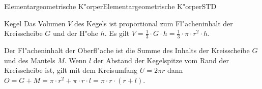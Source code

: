 \begin{MXContent}{Elementargeometrische K"orper}{Elementargeometrische K"orper}{STD}
\begin{MXInfo}{Kegel}
Das Volumen $V$ des Kegels ist proportional zum Fl"acheninhalt der 
Kreisscheibe $G$ und der H"ohe $h$. 
Es gilt $V = \frac{1}{3} \cdot G \cdot h %
 = \frac{1}{3} \cdot \pi \cdot r^2 \cdot h$.

Der Fl"acheninhalt der Oberfl"ache ist die Summe des Inhalts der 
Kreisscheibe $G$ und des Mantels $M$. Wenn $l$ der Abstand der 
Kegelspitze vom Rand der Kreisscheibe ist, 
gilt mit dem Kreisumfang $U =  2 \pi r$ dann
$O = G + M = \pi \cdot r^2 + \pi \cdot r \cdot l %
 = \pi \cdot r \cdot (r + l)$.
\end{MXInfo}

\end{MXContent}




